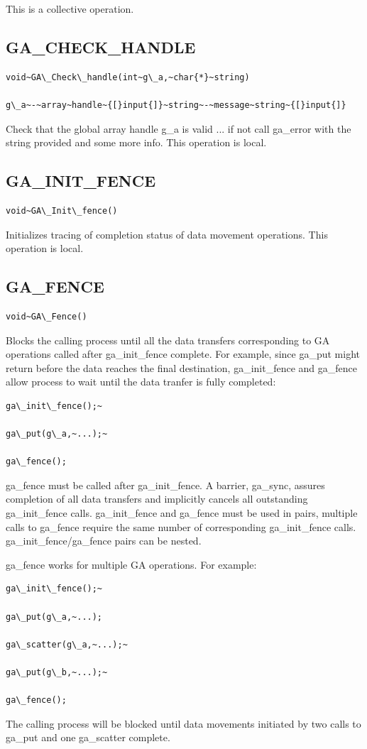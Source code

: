 This is a collective operation. 


\subsection*{\label{sub:GA_CHECK_HANDLE}GA\_CHECK\_HANDLE}
\begin{verbatim}
void~GA\_Check\_handle(int~g\_a,~char{*}~string)

g\_a~-~array~handle~{[}input{]}~string~-~message~string~{[}input{]}
\end{verbatim}
Check that the global array handle g\_a is valid ... if not call ga\_error
with the string provided and some more info. This operation is local. 


\subsection*{\label{sub:GA_INIT_FENCE}GA\_INIT\_FENCE}
\begin{verbatim}
void~GA\_Init\_fence()
\end{verbatim}
Initializes tracing of completion status of data movement operations.
This operation is local. 


\subsection*{\label{sub:GA_FENCE}GA\_FENCE}
\begin{verbatim}
void~GA\_Fence()
\end{verbatim}
Blocks the calling process until all the data transfers corresponding
to GA operations called after ga\_init\_fence complete. For example,
since ga\_put might return before the data reaches the final destination,
ga\_init\_fence and ga\_fence allow process to wait until the data
tranfer is fully completed:
\begin{verbatim}
ga\_init\_fence();~

ga\_put(g\_a,~...);~

ga\_fence();
\end{verbatim}
ga\_fence must be called after ga\_init\_fence. A barrier, ga\_sync,
assures completion of all data transfers and implicitly cancels all
outstanding ga\_init\_fence calls. ga\_init\_fence and ga\_fence must
be used in pairs, multiple calls to ga\_fence require the same number
of corresponding ga\_init\_fence calls. ga\_init\_fence/ga\_fence
pairs can be nested.

ga\_fence works for multiple GA operations. For example:
\begin{verbatim}
ga\_init\_fence();~

ga\_put(g\_a,~...);

ga\_scatter(g\_a,~...);~

ga\_put(g\_b,~...);~

ga\_fence();
\end{verbatim}
The calling process will be blocked until data movements initiated
by two calls to ga\_put and one ga\_scatter complete. 


